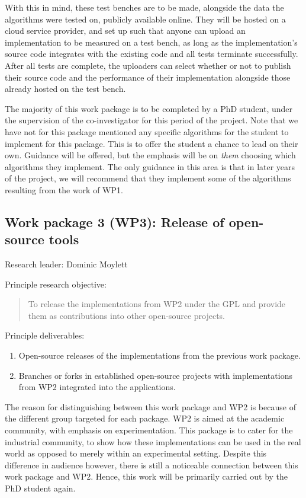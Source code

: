 \documentclass[a4paper,11pt]{article}
\begin{document}
    With this in mind, these test benches are to be made, alongside the data the algorithms were tested on, publicly available online. They will be hosted on a cloud service provider, and set up such that anyone can upload an implementation to be measured on a test bench, as long as the implementation's source code integrates with the existing code and all tests terminate successfully. After all tests are complete, the uploaders can select whether or not to publish their source code and the performance of their implementation alongside those already hosted on the test bench.

    The majority of this work package is to be completed by a PhD student, under the supervision of the co-investigator for this period of the project. Note that we have not for this package mentioned any specific algorithms for the student to implement for this package. This is to offer the student a chance to lead on their own. Guidance will be offered, but the emphasis will be on \textit{them} choosing which algorithms they implement. The only guidance in this area is that in later years of the project, we will recommend that they implement some of the algorithms resulting from the work of WP1.

    \subsection*{Work package 3 (WP3): Release of open-source tools}

    Research leader: Dominic Moylett

    Principle research objective:
    \begin{quote}
        To release the implementations from WP2 under the GPL and provide them as contributions into other open-source projects.
    \end{quote}

    Principle deliverables:
    \begin{enumerate}
        \item Open-source releases of the implementations from the previous work package.
        \item Branches or forks in established open-source projects with implementations from WP2 integrated into the applications.
    \end{enumerate}

    The reason for distinguishing between this work package and WP2 is because of the different group targeted for each package. WP2 is aimed at the academic community, with emphasis on experimentation. This package is to cater for the industrial community, to show how these implementations can be used in the real world as opposed to merely within an experimental setting. Despite this difference in audience however, there is still a noticeable connection between this work package and WP2. Hence, this work will be primarily carried out by the PhD student again.
\end{document}

